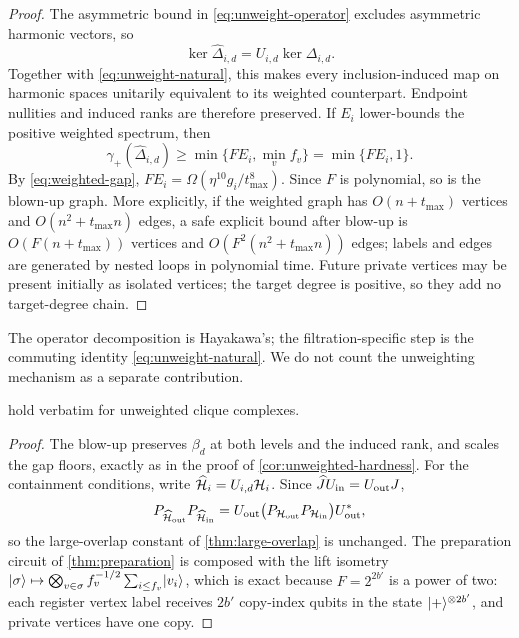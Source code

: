 \begin{proof}
The asymmetric bound in \cref{eq:unweight-operator} excludes asymmetric
harmonic vectors, so
\[
\ker\widehat\Delta_{i,d}=U_{i,d}\ker\Delta_{i,d}.
\]
Together with \cref{eq:unweight-natural}, this makes every inclusion-induced
map on harmonic spaces unitarily equivalent to its weighted counterpart.
Endpoint nullities and induced ranks are therefore preserved.  If \(E_i\)
lower-bounds the positive weighted spectrum, then
\[
\gamma_+(\widehat\Delta_{i,d})
\ge\min\{FE_i,\min_v f_v\}=\min\{FE_i,1\}.
\]
By \cref{eq:weighted-gap}, \(FE_i=
\Omega(\eta^{10}g_i/t_{\max}^{8})\).  Since \(F\) is polynomial, so is the
blown-up graph.  More explicitly, if the weighted graph has
\(O(n+t_{\max})\) vertices and \(O(n^2+t_{\max}n)\) edges, a safe explicit
bound after blow-up is \(O(F(n+t_{\max}))\) vertices and
\(O(F^2(n^2+t_{\max}n))\) edges; labels and edges are generated by nested
loops in polynomial time.  Future private vertices may be present initially as isolated
vertices; the target degree is positive, so they add no target-degree chain.
\end{proof}

The operator decomposition is Hayakawa's; the filtration-specific step is
the commuting identity \cref{eq:unweight-natural}.  We do not count the
unweighting mechanism as a separate contribution.

\begin{corollary}
\label{cor:unweighted-general}
 hold
verbatim for unweighted clique complexes.
\end{corollary}

\begin{proof}
The blow-up preserves \(\beta_d\) at both levels and the induced rank, and
scales the gap floors, exactly as in the proof of
\cref{cor:unweighted-hardness}.  For the containment conditions, write
\(\widehat{\mathcal{H}}_i=U_{i,d}\mathcal{H}_i\).  Since \(\widehat J U_{\rm in}=U_{\rm out}J\),
\[
P_{\widehat{\mathcal{H}}_{\rm out}}P_{\widehat{\mathcal{H}}_{\rm in}}
=U_{\rm out}\bigl(P_{\mathcal{H}_{\rm out}}P_{\mathcal{H}_{\rm in}}\bigr)U_{\rm out}^*,
\]
so the large-overlap constant of \cref{thm:large-overlap} is unchanged.  The
preparation circuit of \cref{thm:preparation} is composed with the lift
isometry \(\lvert \sigma\rangle\mapsto\bigotimes_{v\in\sigma}f_v^{-1/2}\sum_{i\le f_v}\lvert v_i\rangle\),
which is exact because \(F=2^{2b'}\) is a power of two: each register vertex
label receives \(2b'\) copy-index qubits in the state \(\lvert +\rangle^{\otimes2b'}\),
and private vertices have one copy.
\end{proof}
